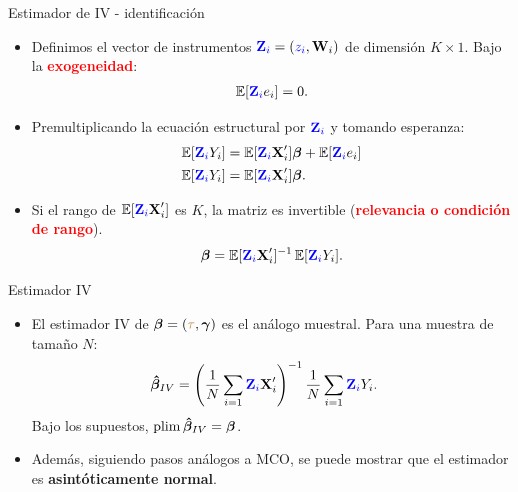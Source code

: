\documentclass[10pt, xcolor=dvipsnames]{beamer}
\begin{document}
\begin{frame}{Estimador de IV - identificación}
\begin{itemize}
	\item Definimos el vector de instrumentos $\textcolor{blue}{\textbf{Z}_i} = (\textcolor{blue}{z_i}, \textbf{W}_i)$ de dimensión $K \times 1$. Bajo la \textcolor{red}{\textbf{exogeneidad}}:
        \begin{align*}
    \operatorname{\mathbb{E}}[\textcolor{blue}{\textbf{Z}_i}e_i] = 0.
    \end{align*}
 	\item Premultiplicando la ecuación estructural por $\textcolor{blue}{\textbf{Z}_i}$ y tomando esperanza:
    \begin{align*}
    \begin{split}
    \operatorname{\mathbb{E}}[\textcolor{blue}{\textbf{Z}_i} Y_i] &= \operatorname{\mathbb{E}}[\textcolor{blue}{\textbf{Z}_i}\textbf{X}'_i]\boldsymbol{\beta} + \operatorname{\mathbb{E}}[\textcolor{blue}{\textbf{Z}_i} e_i] \\
    \operatorname{\mathbb{E}}[\textcolor{blue}{\textbf{Z}_i} Y_i] &= \operatorname{\mathbb{E}}[\textcolor{blue}{\textbf{Z}_i}\textbf{X}'_i]\boldsymbol{\beta}.
    \end{split}
    \end{align*}
    \smallspace
    \item Si el rango de $\operatorname{\mathbb{E}}[\textcolor{blue}{\textbf{Z}_i}\textbf{X}'_i]$ es $K$, la matriz es invertible (\textcolor{red}{\textbf{relevancia o condición de rango}}).
    \begin{align*}
    \begin{split}
    \boldsymbol{\beta} = \operatorname{\mathbb{E}}[\textcolor{blue}{\textbf{Z}_i}\textbf{X}'_i]^{-1} \operatorname{\mathbb{E}}[\textcolor{blue}{\textbf{Z}_i} Y_i]. 
    \end{split}
    \end{align*}	
\end{itemize}	
\end{frame}	


\begin{frame}{Estimador IV}
\begin{itemize}
	\item El estimador IV de $\boldsymbol{\beta} = (\textcolor{brown}{\tau}, \boldsymbol{\gamma})$ es el análogo muestral. Para una muestra de tamaño $N$:
    \begin{align*}
    \begin{split}
    \boldsymbol{\hat{\beta}}_{IV} &= \left(\frac{1}{N}\sum_{i=1} \textcolor{blue}{\textbf{Z}_i} \textbf{X}'_i \right)^{-1} \frac{1}{N} \sum_{i=1} \textcolor{blue}{\textbf{Z}_i} Y_i.
    \end{split}
    \end{align*}
    Bajo los supuestos, $\plim \betaBH_{IV} = \betaB$. %
    \vspace{1em}
    \item Además, siguiendo pasos análogos a MCO, se puede mostrar que el estimador es \textbf{asintóticamente normal}.
\end{itemize}
\end{frame}	
\end{document}
